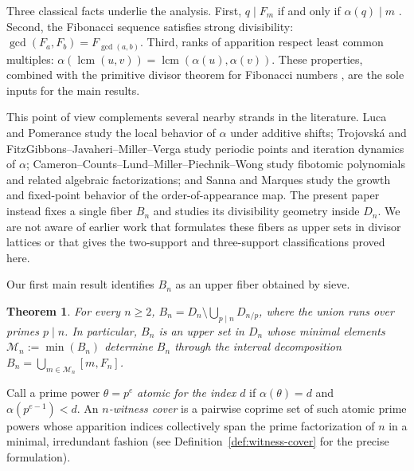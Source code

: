 \documentclass[11pt,letterpaper]{article}
\numberwithin{equation}{section}
\theoremstyle{plain}
\newtheorem{theorem}{Theorem}[section]
\theoremstyle{definition}
\theoremstyle{remark}
\DeclareMathOperator{\lcmop}{lcm}
\begin{document}
Three classical facts underlie the analysis. First, $q\mid F_m$ if and only if
$\alpha(q)\mid m$
\cite{Wall1960FibonacciModm,Vinson1963RankApparition}. Second, the Fibonacci
sequence satisfies strong divisibility: $\gcd(F_a,F_b)=F_{\gcd(a,b)}$.
Third, ranks of apparition respect least common multiples:
$\alpha(\lcmop(u,v))=\lcmop(\alpha(u),\alpha(v))$. These properties, combined
with the primitive divisor theorem for Fibonacci numbers
\cite{Carmichael1913PrimitiveDivisors,BiluHanrotVoutier2001PrimitiveDivisorsLucas},
are the sole inputs for the main results.

This point of view complements several nearby strands in the literature.
Luca and Pomerance \cite{LucaPomerance2014LocalBehavior} study the local
behavior of $\alpha$ under additive shifts; Trojovsk\'a
\cite{Trojovska2020PeriodicPoints} and FitzGibbons--Javaheri--Miller--Verga
\cite{FitzGibbonsJavaheriMillerVerga2025Dynamics} study periodic points and
iteration dynamics of $\alpha$; Cameron--Counts--Lund--Miller--Piechnik--Wong
\cite{CameronCountsLundMillerPiechnikWong2022Fibotomic} study fibotomic
polynomials and related algebraic factorizations; and Sanna
\cite{Sanna2016LucasSequences} and Marques \cite{Marques2012OrderAppearance}
study the growth and fixed-point behavior of the order-of-appearance map. The
present paper instead fixes a single fiber $B_n$ and studies its divisibility
geometry inside $D_n$. We are not aware of earlier work that formulates these
fibers as upper sets in divisor lattices or that gives the two-support and
three-support classifications proved here.

Our first main result identifies $B_n$ as an upper fiber obtained by sieve.

\begin{theorem}\label{thm:intro-upper-fiber}
For every $n\ge 2$, $B_n=D_n\setminus\bigcup_{p\mid n}D_{n/p}$, where the
union runs over primes $p\mid n$. In particular, $B_n$ is an upper set in
$D_n$ whose minimal elements $\mathcal M_n:=\min(B_n)$ determine $B_n$
through the interval decomposition $B_n=\bigcup_{m\in\mathcal M_n}[m,F_n]$.
\end{theorem}

Call a prime power $\theta=p^e$ \emph{atomic for the index $d$} if
$\alpha(\theta)=d$ and $\alpha(p^{e-1})<d$. An \emph{$n$-witness cover} is a
pairwise coprime set of such atomic prime powers whose apparition indices
collectively span the prime factorization of $n$ in a minimal, irredundant
fashion (see Definition~\ref{def:witness-cover} for the precise formulation).
\end{document}
